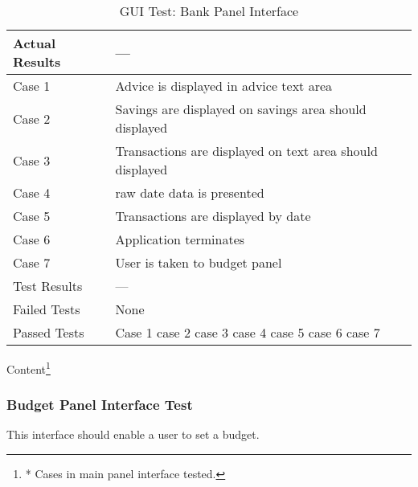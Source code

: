 \documentclass{article}
\begin{document}
\begin{table}[htbp]
\begin{center}
\begin{tabular}{|l | l|}
Actual Results & ---\\
\hline
Case 1 & Advice is displayed in advice text area  \\
 \hline
Case 2 & Savings are displayed on savings area should displayed  \\
\hline
Case 3 &  Transactions are displayed on text area should displayed  \\
\hline
 Case 4 &  raw date data is presented \\
\hline
Case 5 &  Transactions are displayed by date  \\
\hline
Case 6 &  Application terminates \\
\hline
Case 7 &  User is taken to budget panel  \\
\hline
Test Results & ---\\
\hline
Failed Tests & None\\
\hline
Passed Tests & Case 1 case 2 case 3 case 4 case 5 case 6 case 7\\
\hline


\end{tabular}
\end{center}

\caption{GUI Test: Bank Panel Interface}
Content\footnote{* Cases in main panel interface tested.}
\end{table}
\label{table:3xxxxx}


\clearpage

\subsubsection{Budget Panel Interface Test}
This interface should enable a user to set a budget.
\end{document}
